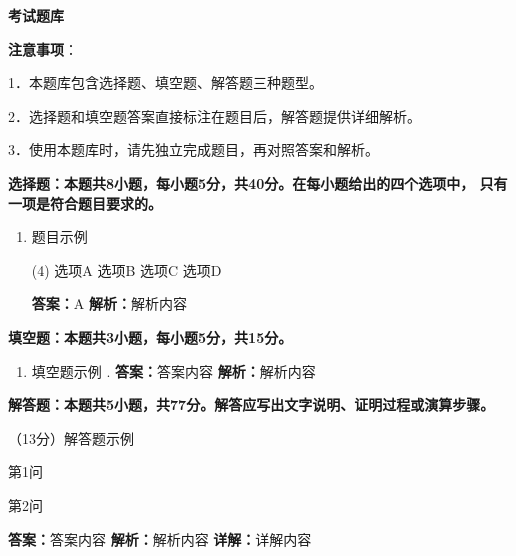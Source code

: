 \documentclass[12pt, a4paper, oneside]{ctexart}
\newcommand{\blank}{\underline{\hspace{2cm}}}
\newcommand{\answer}[1]{\textbf{答案：}#1}
\newcommand{\analysis}[1]{\textbf{解析：}#1}
\newcommand{\explanation}[1]{\textbf{详解：}#1}
\begin{document}
\begin{center}
    \LARGE{\textbf{考试题库}}
\end{center}

\vspace{0.5em}

\noindent\textbf{注意事项}：

1．本题库包含选择题、填空题、解答题三种题型。

2．选择题和填空题答案直接标注在题目后，解答题提供详细解析。

3．使用本题库时，请先独立完成题目，再对照答案和解析。

\vspace{1em}


\noindent\textbf{选择题：本题共8小题，每小题5分，共40分。在每小题给出的四个选项中，
只有一项是符合题目要求的。}

\begin{enumerate}[itemsep=0.3em]
    \item 题目示例
    \begin{tasks}(4)
        \task 选项A
        \task 选项B
        \task 选项C
        \task 选项D
    \end{tasks}
    \answer{A}
    \analysis{解析内容}
\end{enumerate}


\noindent\textbf{填空题：本题共3小题，每小题5分，共15分。}

\begin{enumerate}[start=9, itemsep=0.8em]
    \item 填空题示例 \blank.
    \answer{答案内容}
    \analysis{解析内容}
\end{enumerate}


\noindent\textbf{解答题：本题共5小题，共77分。解答应写出文字说明、证明过程或演算步骤。}

\begin{examenum}
    \item （13分）解答题示例
    \begin{examenum}
        \item 第1问
        \item 第2问
    \end{examenum}
    \answer{答案内容}
    \analysis{解析内容}
    \explanation{详解内容}
\end{examenum}
\end{document}
